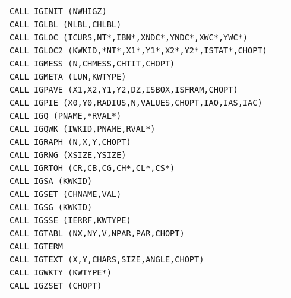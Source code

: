 \begin{longtable}{|>{\small\tt}p{.87\linewidth}r|}
CALL IGINIT (NWHIGZ)                                  & \pageref{IGINIT}      \\
CALL IGLBL (NLBL,CHLBL)                               & \pageref{IGLBL}       \\
CALL IGLOC (ICURS,NT*,IBN*,XNDC*,YNDC*,XWC*,YWC*)     & \pageref{IGLOC}       \\
CALL IGLOC2 (KWKID,*NT*,X1*,Y1*,X2*,Y2*,ISTAT*,CHOPT) & \pageref{IGLOC2}      \\
CALL IGMESS (N,CHMESS,CHTIT,CHOPT)                    & \pageref{IGMESS}      \\
CALL IGMETA (LUN,KWTYPE)                              & \pageref{IGMETA}      \\
CALL IGPAVE (X1,X2,Y1,Y2,DZ,ISBOX,ISFRAM,CHOPT)       & \pageref{IGPAVE}      \\
CALL IGPIE (X0,Y0,RADIUS,N,VALUES,CHOPT,IAO,IAS,IAC)  & \pageref{IGPIE}       \\
CALL IGQ (PNAME,*RVAL*)                               & \pageref{IGQ}         \\
CALL IGQWK (IWKID,PNAME,RVAL*)                        & \pageref{IGQWK}       \\
CALL IGRAPH (N,X,Y,CHOPT)                             & \pageref{IGRAPH}      \\
CALL IGRNG (XSIZE,YSIZE)                              & \pageref{IGRNG}       \\
CALL IGRTOH (CR,CB,CG,CH*,CL*,CS*)                    & \pageref{IGRTOH}      \\
CALL IGSA (KWKID)                                     & \pageref{IGSA}        \\
CALL IGSET (CHNAME,VAL)                               & \pageref{IGSET}       \\
CALL IGSG (KWKID)                                     & \pageref{IGSG}        \\
CALL IGSSE (IERRF,KWTYPE)                             & \pageref{IGSSE}       \\
CALL IGTABL (NX,NY,V,NPAR,PAR,CHOPT)                  & \pageref{IGTABL}      \\
CALL IGTERM                                           & \pageref{IGTERM}      \\
CALL IGTEXT (X,Y,CHARS,SIZE,ANGLE,CHOPT)              & \pageref{IGTEXT}      \\
CALL IGWKTY (KWTYPE*)                                 & \pageref{IGWKTY}      \\
CALL IGZSET (CHOPT)                                   & \pageref{IGZSET}      \\

\end{longtable}
